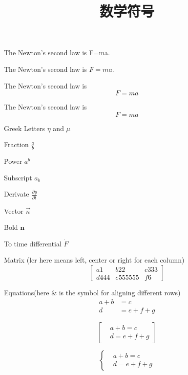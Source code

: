 \documentclass{ctexart}
\title{数学符号}
\begin{document}
\maketitle

The Newton's second law is F=ma.

The Newton's second law is $F=ma$.

The Newton's second law is
$$F=ma$$

The Newton's second law is
\[F=ma\]

Greek Letters $\eta$ and $\mu$

Fraction $\frac{a}{b}$

Power $a^b$

Subscript $a_b$

Derivate $\frac{\partial y}{\partial t}$

Vector $\vec{n}$

Bold $\mathbf{n}$

To time differential $\dot{F}$

Matrix (lcr here means left, center or right for each column)
\[
  \left[
    \begin{array}{lcr}
      a1 & b22 & c333 \\
      d444 & e555555 & f6
    \end{array}
  \right]
\]

Equations(here \& is the symbol for aligning different rows)
\begin{align}
  a+b&=c\\
  d&=e+f+g
\end{align}

\[
  \left[
    \begin{aligned}
      &a+b=c\\
      &d=e+f+g
    \end{aligned}
  \right]
\]

\[
  \left\{
    \begin{aligned}
      &a+b=c\\
      &d=e+f+g
    \end{aligned}
  \right.
\]
\end{document}
